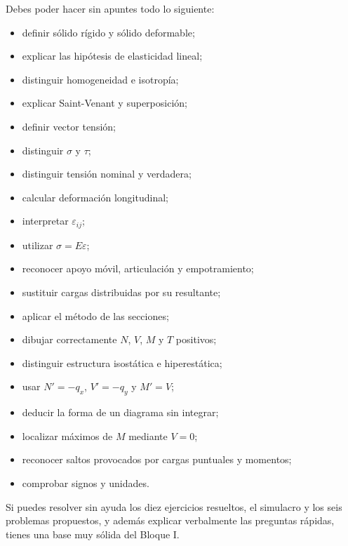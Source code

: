
Debes poder hacer sin apuntes todo lo siguiente:
\begin{itemize}
  \item definir sólido rígido y sólido deformable;
  \item explicar las hipótesis de elasticidad lineal;
  \item distinguir homogeneidad e isotropía;
  \item explicar Saint-Venant y superposición;
  \item definir vector tensión;
  \item distinguir $\sigma$ y $\tau$;
  \item distinguir tensión nominal y verdadera;
  \item calcular deformación longitudinal;
  \item interpretar $\varepsilon_{ij}$;
  \item utilizar $\sigma=E\varepsilon$;
  \item reconocer apoyo móvil, articulación y empotramiento;
  \item sustituir cargas distribuidas por su resultante;
  \item aplicar el método de las secciones;
  \item dibujar correctamente $N$, $V$, $M$ y $T$ positivos;
  \item distinguir estructura isostática e hiperestática;
  \item usar $N'=-q_x$, $V'=-q_y$ y $M'=V$;
  \item deducir la forma de un diagrama sin integrar;
  \item localizar máximos de $M$ mediante $V=0$;
  \item reconocer saltos provocados por cargas puntuales y momentos;
  \item comprobar signos y unidades.
\end{itemize}

\begin{resumen}
Si puedes resolver sin ayuda los diez ejercicios resueltos, el simulacro y los seis problemas propuestos, y además explicar verbalmente las preguntas rápidas, tienes una base muy sólida del Bloque I.
\end{resumen}
